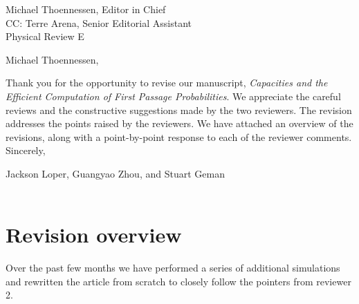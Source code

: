 \documentclass{article}
\begin{document}
\hfill{}\begin{minipage}{4in}
\raggedleft
Michael Thoennessen, Editor in Chief\\
CC: Terre Arena, Senior Editorial Assistant\\
Physical Review E\\
\end{minipage}

\vspace{.5in}

\noindent
Michael Thoennessen,

\vspace{.2in}

Thank you for the opportunity to revise our manuscript, {\em Capacities and the Efficient Computation of First
Passage Probabilities}.
We appreciate the careful reviews and the constructive suggestions made by the two reviewers.   The revision addresses the points raised by the reviewers. We have attached an overview of the revisions, along with a point-by-point response to each of the reviewer comments. \\




\noindent
Sincerely,

Jackson Loper, Guangyao Zhou, and Stuart Geman\\\\


\newpage

\section{Revision overview}

Over the past few months we have performed a series of additional simulations and rewritten the article from scratch to closely follow the pointers from reviewer 2.
\end{document}
